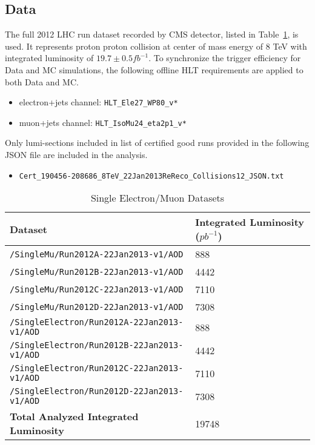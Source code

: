 \documentclass{cmspaperpdf}
\begin{document}
\subsection{Data}
The full 2012 LHC run dataset recorded by CMS detector, listed in Table~\ref{tab:datasets}, is used.  It represents proton proton collision at center of mass energy of 8 TeV with integrated luminosity of $19.7 \pm 0.5 fb^{-1}$.  
To synchronize the trigger efficiency for Data and MC simulations, the following offline HLT requirements are applied to both Data and MC.
\begin{itemize}
\item electron+jets channel: \texttt{HLT\_Ele27\_WP80\_v*}
\item muon+jets channel: \texttt{HLT\_IsoMu24\_eta2p1\_v*}
\end{itemize}
Only lumi-sections included in list of certified good runs provided in the following JSON file are included in the analysis. 
\begin{itemize}
\item \texttt{Cert\_190456-208686\_8TeV\_22Jan2013ReReco\_Collisions12\_JSON.txt}
\end{itemize}



\begin{table}[h!]
\small
\caption{\small Single Electron/Muon Datasets}
\centering
\begin{tabular}{| p{2.55 cm}  p{8.5 cm}  p{3 cm} |}
\hline

\multicolumn{2}{|l}{\textbf{Dataset}} & \textbf{Integrated Luminosity ($\displaystyle{pb^{-1}}$)}\\[0.5ex]
\hline
\multicolumn{2}{|l}{\texttt{/SingleMu/Run2012A-22Jan2013-v1/AOD}} & 888\\
\multicolumn{2}{|l}{\texttt{/SingleMu/Run2012B-22Jan2013-v1/AOD}} & 4442\\
\multicolumn{2}{|l}{\texttt{/SingleMu/Run2012C-22Jan2013-v1/AOD}} & 7110\\
\multicolumn{2}{|l}{\texttt{/SingleMu/Run2012D-22Jan2013-v1/AOD}} & 7308\\
\multicolumn{2}{|l}{\texttt{/SingleElectron/Run2012A-22Jan2013-v1/AOD}} & 888\\
\multicolumn{2}{|l}{\texttt{/SingleElectron/Run2012B-22Jan2013-v1/AOD}} & 4442\\
\multicolumn{2}{|l}{\texttt{/SingleElectron/Run2012C-22Jan2013-v1/AOD}} & 7110\\
\multicolumn{2}{|l}{\texttt{/SingleElectron/Run2012D-22Jan2013-v1/AOD}} & 7308\\

\hline
\multicolumn{2}{|l}{\textbf{Total Analyzed Integrated Luminosity}} & 19748\\
\hline
\end{tabular}
\label{tab:datasets}
\end{table}
\end{document}
